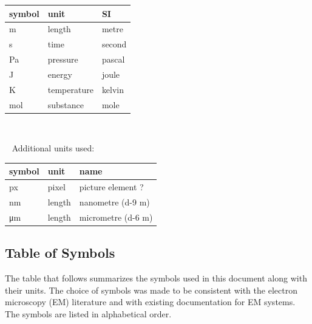 \documentclass[12pt]{article}
\begin{document}
\renewcommand{\arraystretch}{1.2}
  \noindent \begin{tabular}{l l l} 
    \toprule		
    \textbf{symbol} & \textbf{unit} & \textbf{SI}\\
    \midrule 
    \si{\metre} & length & metre\\
    \si{\second} & time & second\\
    \si{Pa} & pressure & pascal\\
    \si{J} & energy & joule\\
    \si{K} & temperature & kelvin\\
    \si{mol} & substance & mole\\
    \bottomrule
  \end{tabular}
~\newline
 
~\newline
Additional units used:
~\newline

  \noindent \begin{tabular}{l l l} 
    \toprule		
    \textbf{symbol} & \textbf{unit} & \textbf{name}\\
    \midrule
    px & pixel & picture element ?\\
    \si{\nm} & length & nanometre (\num{d-9} m)\\
    \si{\um} & length & micrometre (\num{d-6} m)\\
    \bottomrule
  \end{tabular}

\subsection{Table of Symbols}

The table that follows summarizes the symbols used in this document along with
their units.  The choice of symbols was made to be consistent with the electron
microscopy (EM) literature and with existing documentation for EM systems. 
The symbols are listed in alphabetical order.
\end{document}
